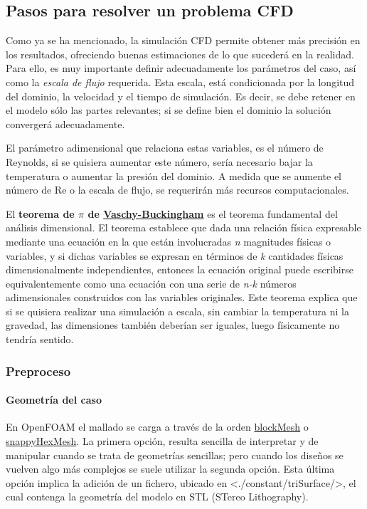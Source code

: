\subsection{Pasos para resolver un problema CFD}\label{header-n114}

Como ya se ha mencionado, la simulación CFD permite obtener más
precisión en los resultados, ofreciendo buenas estimaciones de lo que
sucederá en la realidad. Para ello, es muy importante definir
adecuadamente los parámetros del caso, así como la \emph{escala de
flujo} requerida. Esta escala, está condicionada por la longitud del
dominio, la velocidad y el tiempo de simulación. Es decir, se debe
retener en el modelo sólo las partes relevantes; si se define bien el
dominio la solución convergerá adecuadamente.

El parámetro adimensional que relaciona estas variables, es el número de
Reynolds, si se quisiera aumentar este número, sería necesario bajar la
temperatura o aumentar la presión del dominio. A medida que se aumente
el número de Re o la escala de flujo, se requerirán más recursos
computacionales.

El \textbf{teorema de \(\pi\) de
\href{https://es.wikipedia.org/wiki/Teorema_\%CF\%80_de_Vaschy-Buckingham}{Vaschy-Buckingham}}
es el teorema fundamental del análisis dimensional. El teorema establece
que dada una relación física expresable mediante una ecuación en la que
están involucradas \emph{n} magnitudes físicas o variables, y si dichas
variables se expresan en términos de \emph{k} cantidades físicas
dimensionalmente independientes, entonces la ecuación original puede
escribirse equivalentemente como una ecuación con una serie de
\emph{n-k} números adimensionales construidos con las variables
originales. Este teorema explica que si se quisiera realizar una
simulación a escala, sin cambiar la temperatura ni la gravedad, las
dimensiones también deberían ser iguales, luego físicamente no tendría
sentido.

\subsubsection{Preproceso}\label{header-n123}

\paragraph{Geometría del caso}\label{header-n126}

En OpenFOAM el mallado se carga a través de la orden
\href{http://cfd.direct/openfoam/user-guide/blockMesh/\#x25-1420005.3}{blockMesh}
o
\href{http://cfd.direct/openfoam/user-guide/snappyHexMesh/\#x26-1520005.4}{snappyHexMesh}.
La primera opción, resulta sencilla de interpretar y de manipular cuando
se trata de geometrías sencillas; pero cuando los diseños se vuelven
algo más complejos se suele utilizar la segunda opción. Esta última
opción implica la adición de un fichero, ubicado en
\textless{}./constant/triSurface/\textgreater{}, el cual contenga la
geometría del modelo en STL (STereo Lithography).

